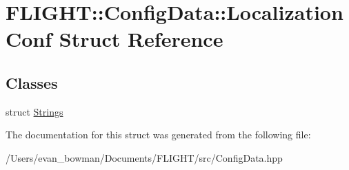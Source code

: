 \hypertarget{struct_f_l_i_g_h_t_1_1_config_data_1_1_localization_conf}{}\section{F\+L\+I\+G\+HT\+:\+:Config\+Data\+:\+:Localization\+Conf Struct Reference}
\label{struct_f_l_i_g_h_t_1_1_config_data_1_1_localization_conf}
\subsection*{Classes}
\begin{DoxyCompactItemize}
\item 
struct \hyperlink{struct_f_l_i_g_h_t_1_1_config_data_1_1_localization_conf_1_1_strings}{Strings}
\end{DoxyCompactItemize}


The documentation for this struct was generated from the following file\+:\begin{DoxyCompactItemize}
\item 
/\+Users/evan\+\_\+bowman/\+Documents/\+F\+L\+I\+G\+H\+T/src/Config\+Data.\+hpp\end{DoxyCompactItemize}
